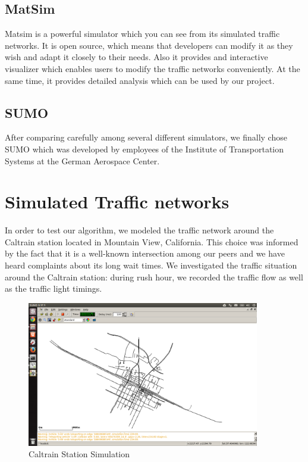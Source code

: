 \documentclass{article} %
\begin{document}
\subsection{MatSim}

Matsim is a powerful simulator which you can see from its simulated traffic networks. 
It is open source, which means that developers can modify it as they wish and adapt it closely to their needs. Also it provides and interactive visualizer which enables users to modify the traffic networks conveniently. At the same time, it provides detailed analysis which can be used by our project.

\subsection{SUMO}
After comparing carefully among several different simulators, we finally chose SUMO which was developed by employees of the Institute of Transportation Systems at the German Aerospace Center.

\section{Simulated Traffic networks}
In order to test our algorithm, we modeled the traffic network around the Caltrain station located in Mountain View, California. This choice was informed by the fact that it is a well-known intersection among our peers and we have heard complaints about its long wait times. We investigated the traffic situation around the Caltrain station: during rush hour, we recorded the traffic flow as well as the traffic light timings.
\begin{figure}
\includegraphics[width=4in]{images/simulator/caltrain.png}
\caption{Caltrain Station Simulation}
\end{figure}
\end{document}
